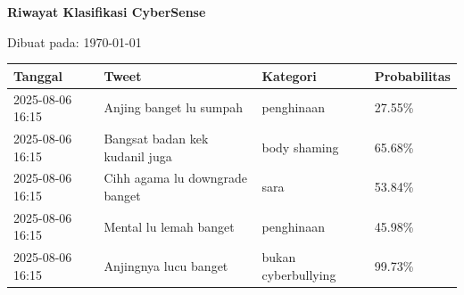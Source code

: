 \documentclass[a4paper]{article}
\begin{document}
\centerline{\textbf{\Large Riwayat Klasifikasi CyberSense}}
\centerline{Dibuat pada: \today}

\begin{longtable}{p{3cm}p{5cm}p{2.5cm}p{2.5cm}}
\toprule
\textbf{Tanggal} & \textbf{Tweet} & \textbf{Kategori} & \textbf{Probabilitas} \\
\midrule
\endhead
2025-08-06 16:15 & Anjing banget lu sumpah & penghinaan & 27.55\% \\ 
2025-08-06 16:15 & Bangsat badan kek kudanil juga & body shaming & 65.68\% \\ 
2025-08-06 16:15 & Cihh agama lu downgrade banget & sara & 53.84\% \\ 
2025-08-06 16:15 & Mental lu lemah banget & penghinaan & 45.98\% \\ 
2025-08-06 16:15 & Anjingnya lucu banget & bukan cyberbullying & 99.73\% \\ 
\bottomrule
\end{longtable}
\end{document}
